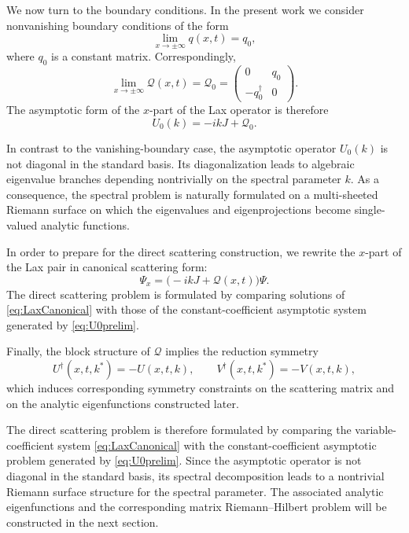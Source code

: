 \documentclass[11pt]{amsart}
\theoremstyle{definition}
\numberwithin{equation}{section}
\begin{document}
We now turn to the boundary conditions. In the present work we consider nonvanishing boundary conditions of the form
\begin{equation}
\lim_{x\to\pm\infty} q(x,t)=q_0,
\label{eq:NZBCprelim}
\end{equation}
where $q_0$ is a constant matrix. Correspondingly,
\begin{equation}
\lim_{x\to\pm\infty} \mathcal Q(x,t)=\mathcal Q_0
=
\begin{pmatrix}
0 & q_0 \\
- q_0^\dagger & 0
\end{pmatrix}.
\label{eq:Qhat0}
\end{equation}
The asymptotic form of the $x$-part of the Lax operator is therefore
\begin{equation}
U_0(k) = -ikJ + \mathcal Q_0.
\label{eq:U0prelim}
\end{equation}

In contrast to the vanishing-boundary case, the asymptotic operator $U_0(k)$ is not diagonal in the standard basis. Its diagonalization leads to algebraic eigenvalue branches depending nontrivially on the spectral parameter $k$. As a consequence, the spectral problem is naturally formulated on a multi-sheeted Riemann surface on which the eigenvalues and eigenprojections become single-valued analytic functions.

In order to prepare for the direct scattering construction, we rewrite the $x$-part of the Lax pair in canonical scattering form:
\begin{equation}
\Psi_x = \bigl(-ikJ + \mathcal Q(x,t)\bigr)\Psi.
\label{eq:LaxCanonical}
\end{equation}
The direct scattering problem is formulated by comparing solutions of \eqref{eq:LaxCanonical} with those of the constant-coefficient asymptotic system generated by \eqref{eq:U0prelim}.

Finally, the block structure of $\mathcal Q$ implies the reduction symmetry
\begin{equation}
U^\dagger(x,t,k^*) = -U(x,t,k), \qquad
V^\dagger(x,t,k^*) = -V(x,t,k),
\label{eq:LaxReduction}
\end{equation}
which induces corresponding symmetry constraints on the scattering matrix and on the analytic eigenfunctions constructed later.

The direct scattering problem is therefore formulated by comparing the variable-coefficient system \eqref{eq:LaxCanonical} with the constant-coefficient asymptotic problem generated by \eqref{eq:U0prelim}. Since the asymptotic operator is not diagonal in the standard basis, its spectral decomposition leads to a nontrivial Riemann surface structure for the spectral parameter. The associated analytic eigenfunctions and the corresponding matrix Riemann--Hilbert problem will be constructed in the next section.  
\end{document}
